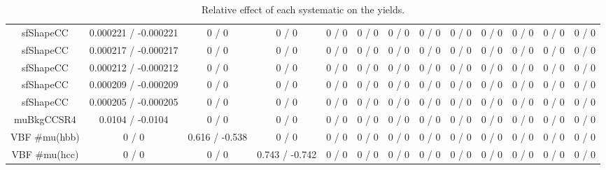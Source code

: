 \documentclass[10pt]{article}
\begin{document}
\begin{table}[htbp]
\begin{center}
\begin{tabular}{|c|c|c|c|c|c|c|c|c|c|c|c|c|}
  sfShapeCC & 0.000221 / -0.000221 & 0 / 0 & 0 / 0 & 0 / 0 & 0 / 0 & 0 / 0 & 0 / 0 & 0 / 0 & 0 / 0 & 0 / 0 & 0 / 0 & 0 / 0 \\ 
  sfShapeCC & 0.000217 / -0.000217 & 0 / 0 & 0 / 0 & 0 / 0 & 0 / 0 & 0 / 0 & 0 / 0 & 0 / 0 & 0 / 0 & 0 / 0 & 0 / 0 & 0 / 0 \\ 
  sfShapeCC & 0.000212 / -0.000212 & 0 / 0 & 0 / 0 & 0 / 0 & 0 / 0 & 0 / 0 & 0 / 0 & 0 / 0 & 0 / 0 & 0 / 0 & 0 / 0 & 0 / 0 \\ 
  sfShapeCC & 0.000209 / -0.000209 & 0 / 0 & 0 / 0 & 0 / 0 & 0 / 0 & 0 / 0 & 0 / 0 & 0 / 0 & 0 / 0 & 0 / 0 & 0 / 0 & 0 / 0 \\ 
  sfShapeCC & 0.000205 / -0.000205 & 0 / 0 & 0 / 0 & 0 / 0 & 0 / 0 & 0 / 0 & 0 / 0 & 0 / 0 & 0 / 0 & 0 / 0 & 0 / 0 & 0 / 0 \\ 
  muBkgCCSR4 & 0.0104 / -0.0104 & 0 / 0 & 0 / 0 & 0 / 0 & 0 / 0 & 0 / 0 & 0 / 0 & 0 / 0 & 0 / 0 & 0 / 0 & 0 / 0 & 0 / 0 \\ 
  VBF #mu(hbb) & 0 / 0 & 0.616 / -0.538 & 0 / 0 & 0 / 0 & 0 / 0 & 0 / 0 & 0 / 0 & 0 / 0 & 0 / 0 & 0 / 0 & 0 / 0 & 0 / 0 \\ 
  VBF #mu(hcc) & 0 / 0 & 0 / 0 & 0.743 / -0.742 & 0 / 0 & 0 / 0 & 0 / 0 & 0 / 0 & 0 / 0 & 0 / 0 & 0 / 0 & 0 / 0 & 0 / 0 \\ 
\hline 
\end{tabular} 
\caption{Relative effect of each systematic on the yields.} 
\end{center} 
\end{table} 
\end{document}
